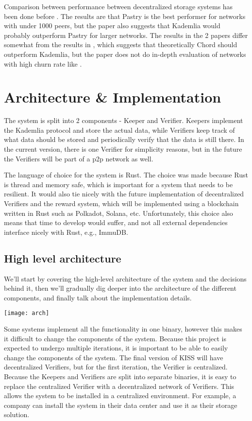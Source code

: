 \documentclass[ twoside,openright,titlepage,numbers=noenddot,headinclude,%
                footinclude=true,cleardoublepage=empty,abstractoff, %
                BCOR=5mm,paper=a4,fontsize=11pt,%
                ngerman,american,%
                ]{scrreprt}
\begin{document}
Comparison between performance between decentralized storage systems has been done before
\cite{kadvschordvspastry, 2019AIPC.2129b0131A}.
The results are that Pastry is the best performer for networks with under 1000 peers, but the paper also suggests
that Kademlia would probably outperform Pastry for larger networks.
The results in the 2 papers differ somewhat from the results in \cite{compstudy}, which suggests that theoretically
Chord should outperform Kademlia, but the paper does not do in-depth evaluation of networks with high churn rate
like \cite{kadvschordvspastry}.

\chapter{Architecture \& Implementation}
\label{cha:arch-impl}

The system is split into 2 components - Keeper and Verifier.
Keepers implement the Kademlia protocol and store the actual data,
while Verifiers keep track of what data should be stored and periodically verify that the data is still there.
In the current version, there is one Verifier for simplicity reasons,
but in the future the Verifiers will be part of a p2p network as well.

The language of choice for the system is Rust.
The choice was made because Rust is thread and memory safe, which is important for a system that needs to be resilient.
It would also tie nicely with the future implementation of decentralized Verifiers and the reward system,
which will be implemented using a blockchain written in Rust such as Polkadot, Solana, etc.
Unfortunately, this choice also means that time to develop would suffer,
and not all external dependencies interface nicely with Rust, e.g., ImmuDB.

\section{High level architecture}
\label{sec:analysis}

We'll start by covering the high-level architecture of the system and the decisions behind it,
then we'll gradually dig deeper into the architecture of the different components,
and finally talk about the implementation details.

\texttt{[image: arch]}

Some systems implement all the functionality in one binary,
however this makes it difficult to change the components of the system.
Because this project is expected to undergo multiple iterations,
it is important to be able to easily change the components of the system.
The final version of KISS will have decentralized Verifiers,
but for the first iteration, the Verifier is centralized.
Because the Keepers and Verifiers are split into separate binaries,
it is easy to replace the centralized Verifier with a decentralized network of Verifiers.
This allows the system to be installed in a centralized environment.
For example, a company can install the system in their data center and use it as their storage solution.
\end{document}
